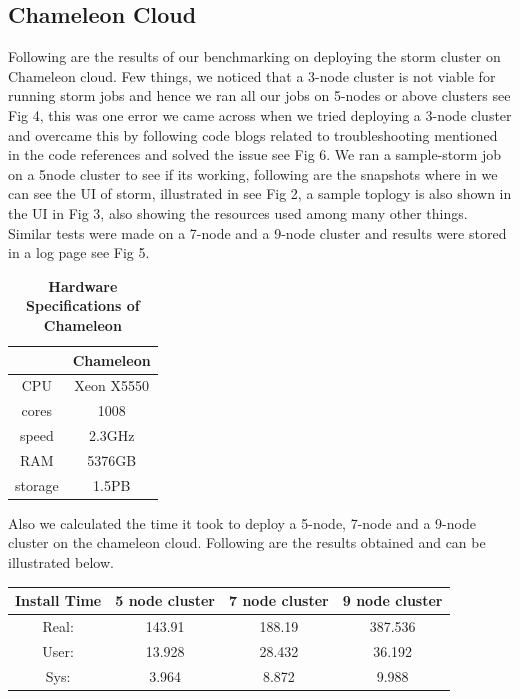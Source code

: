 \documentclass[9pt,twocolumn,twoside]{../../styles/osajnl}
\begin{document}
\subsection{Chameleon Cloud}
Following are the results of our benchmarking on deploying the storm
cluster on Chameleon cloud. Few things, we noticed that a 3-node
cluster is not viable for running storm jobs and hence we ran all our
jobs on 5-nodes or above clusters see Fig 4, this was one error we
came across when we tried deploying a 3-node cluster and overcame this
by following code blogs related to troubleshooting mentioned in the
code references and solved the issue see Fig 6. We ran a sample-storm job on a
5node cluster to see if its working, following are the snapshots where
in we can see the UI of storm, illustrated in see Fig 2, a sample
toplogy is also shown in the UI in Fig 3, also showing the resources
used among many other things. Similar tests were made on a 7-node and
a 9-node cluster and results were stored in a log page see Fig 5.



\begin{table}[htbp]
\centering
\caption{\bf Hardware Specifications of Chameleon}

 \begin{tabular} {| c | c |}
\hline
  & Chameleon   \\ [0.5ex] 
 \hline

    
CPU   & Xeon X5550  \\
 \hline
cores & 1008   \\
 \hline
speed & 2.3GHz \\
 \hline
RAM   & 5376GB  \\
 \hline
storage & 1.5PB  \\ [1ex] 
 \hline

\end{tabular}
  \label{tab:cloud-comparison}
\end{table}



Also we calculated the time it took to deploy a 5-node, 7-node and a 9-node cluster on the chameleon cloud. Following are the results obtained and can be illustrated below.

\begin{center}
 \begin{tabular}{|c|| c c c|} 
 \hline
 Install Time &  5 node cluster & 7 node cluster & 9 node cluster\\ [0.5ex]
 \hline\hline
 Real: & 143.91 & 188.19 & 387.536 \\ 
 \hline
 User: & 13.928 & 28.432 & 36.192 \\
 \hline
 Sys: & 3.964 & 8.872 & 9.988\\
 \hline
\end{tabular}
\end{center}
\end{document}
